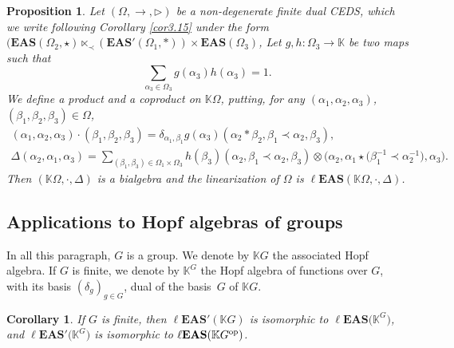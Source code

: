 \documentclass[10pt,a4paper]{amsart}
\numberwithin{equation}{section}
\newtheorem{Corollary}[Theorem]{Corollary}
\newtheorem{Proposition}[Theorem]{Proposition}
 { \theoremstyle{definition}
\newtheorem{Definition}[Theorem]{Definition}
\newtheorem{Note}[Theorem]{Note}
\newtheorem{Example}[Theorem]{Example}
\newtheorem{Remark}[Theorem]{Remark}
\newtheorem{Notation}[Theorem]{Notation}}
\newcommand{\eas}{\mathbf{EAS}}
\newcommand{\leas}{\ell\mathbf{EAS}}
\begin{document}
\begin{Proposition}
Let $(\Omega,\rightarrow,\triangleright)$ be a non-degenerate finite dual CEDS, which we write following Corollary {\rm\ref{cor3.15}} under the form
$(\eas(\Omega_2,\star) \ltimes_\prec (\eas'(\Omega_1,*))\times \eas(\Omega_3)$,
Let $g,h\colon\Omega_3\longrightarrow \mathbb{K}$ be two maps such that
\[\sum_{\alpha_3\in \Omega_3} g(\alpha_3)h(\alpha_3)=1.\]
We define a product and a coproduct on $\mathbb{K}\Omega$, putting, for any $(\alpha_1,\alpha_2,\alpha_3)$, $(\beta_1,\beta_2,\beta_3)\in \Omega$,
\begin{gather*}
(\alpha_1,\alpha_2,\alpha_3)\cdot(\beta_1,\beta_2,\beta_3)=\delta_{\alpha_1,\beta_1}g(\alpha_3)(\alpha_2*\beta_2,\beta_1\prec \alpha_2,\beta_3),\\
\Delta(\alpha_2,\alpha_1,\alpha_3)=\sum_{(\beta_1,\beta_3)\in \Omega_1\times \Omega_3}h(\beta_3)(\alpha_2,\beta_1\prec \alpha_2,\beta_3)\otimes \bigl(\alpha_2,\alpha_1\star\bigl(\beta_1^{-1}\prec \alpha_2^{-1}\bigr),\alpha_3\bigr).
\end{gather*}
Then $(\mathbb{K}\Omega,\cdot,\Delta)$ is a bialgebra and the linearization of $\Omega$ is $\leas(\mathbb{K}\Omega,\cdot,\Delta)$.
\end{Proposition}

\subsection{Applications to Hopf algebras of groups}

In all this paragraph, $G$ is a group. We denote by $\mathbb{K} G$ the associated Hopf algebra. If $G$ is finite, we denote by $\mathbb{K}^G$ the Hopf algebra of functions over $G$, with its basis $(\delta_g)_{g\in G}$, dual of the basis~$G$ of $\mathbb{K} G$.

\begin{Corollary}\label{cor5.15}
If $G$ is finite, then $\leas'(\mathbb{K} G)$ is isomorphic to $\leas\bigl(\mathbb{K}^G\bigr)$, and $\leas'\bigl(\mathbb{K}^G\bigr)$ is isomorphic to $\leas(\mathbb{K} G^{\rm op})$.
\end{Corollary}
\end{document}
